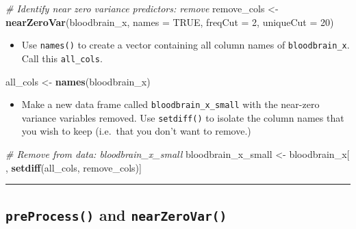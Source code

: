 \documentclass[
]{book}
\newenvironment{Shaded}{\begin{snugshade}}{\end{snugshade}}
\newcommand{\CommentTok}[1]{\textcolor[rgb]{0.56,0.35,0.01}{\textit{#1}}}
\newcommand{\DataTypeTok}[1]{\textcolor[rgb]{0.13,0.29,0.53}{#1}}
\newcommand{\DecValTok}[1]{\textcolor[rgb]{0.00,0.00,0.81}{#1}}
\newcommand{\KeywordTok}[1]{\textcolor[rgb]{0.13,0.29,0.53}{\textbf{#1}}}
\newcommand{\NormalTok}[1]{#1}
\newcommand{\OtherTok}[1]{\textcolor[rgb]{0.56,0.35,0.01}{#1}}
\newcommand{\StringTok}[1]{\textcolor[rgb]{0.31,0.60,0.02}{#1}}
\providecommand{\tightlist}{%
  \setlength{\itemsep}{0pt}\setlength{\parskip}{0pt}}
\begin{document}
\begin{Shaded}
\begin{Highlighting}[]
\CommentTok{# Identify near zero variance predictors: remove}
\NormalTok{remove_cols <-}\StringTok{ }\KeywordTok{nearZeroVar}\NormalTok{(bloodbrain_x, }\DataTypeTok{names =} \OtherTok{TRUE}\NormalTok{, }\DataTypeTok{freqCut =} \DecValTok{2}\NormalTok{, }\DataTypeTok{uniqueCut =} \DecValTok{20}\NormalTok{)}
\end{Highlighting}
\end{Shaded}

\begin{itemize}
\tightlist
\item
  Use \texttt{names()} to create a vector containing all column names of \texttt{bloodbrain\_x}. Call this \texttt{all\_cols}.
\end{itemize}

\begin{Shaded}
\begin{Highlighting}[]
\NormalTok{all_cols <-}\StringTok{ }\KeywordTok{names}\NormalTok{(bloodbrain_x)}
\end{Highlighting}
\end{Shaded}

\begin{itemize}
\tightlist
\item
  Make a new data frame called \texttt{bloodbrain\_x\_small} with the near-zero variance variables removed. Use \texttt{setdiff()} to isolate the column names that you wish to keep (i.e.~that you don't want to remove.)
\end{itemize}

\begin{Shaded}
\begin{Highlighting}[]
\CommentTok{# Remove from data: bloodbrain_x_small}
\NormalTok{bloodbrain_x_small <-}\StringTok{ }\NormalTok{bloodbrain_x[ , }\KeywordTok{setdiff}\NormalTok{(all_cols, remove_cols)]}
\end{Highlighting}
\end{Shaded}

\begin{center}\rule{0.5\linewidth}{0.5pt}\end{center}

\hypertarget{preprocess-and-nearzerovar}{%
\subsection{\texorpdfstring{\texttt{preProcess()} and \texttt{nearZeroVar()}}{preProcess() and nearZeroVar()}}\label{preprocess-and-nearzerovar}}
\end{document}
